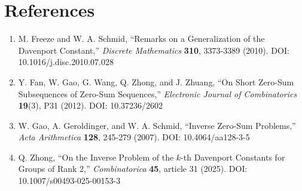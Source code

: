\documentclass[
  11pt,
]{article}
\providecommand{\tightlist}{%
  \setlength{\itemsep}{0pt}\setlength{\parskip}{0pt}}
\begin{document}
\hypertarget{references}{%
\section{References}\label{references}}

\begin{enumerate}
\def\labelenumi{\arabic{enumi}.}
\tightlist
\item
  M. Freeze and W. A. Schmid, ``Remarks on a Generalization of the
  Davenport Constant,'' \emph{Discrete Mathematics} \textbf{310},
  3373-3389 (2010). DOI: 10.1016/j.disc.2010.07.028
\item
  Y. Fan, W. Gao, G. Wang, Q. Zhong, and J. Zhuang, ``On Short Zero-Sum
  Subsequences of Zero-Sum Sequences,'' \emph{Electronic Journal of
  Combinatorics} \textbf{19}(3), P31 (2012). DOI: 10.37236/2602
\item
  W. Gao, A. Geroldinger, and W. A. Schmid, ``Inverse Zero-Sum
  Problems,'' \emph{Acta Arithmetica} \textbf{128}, 245-279 (2007). DOI:
  10.4064/aa128-3-5
\item
  Q. Zhong, ``On the Inverse Problem of the \(k\)-th Davenport Constants
  for Groups of Rank 2,'' \emph{Combinatorica} \textbf{45}, article 31
  (2025). DOI: 10.1007/s00493-025-00153-3
\end{enumerate}
\end{document}

